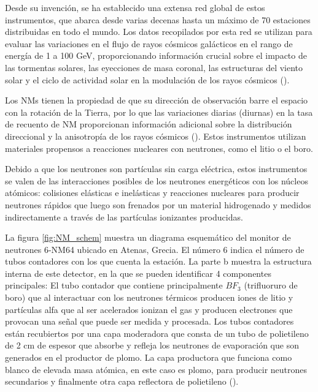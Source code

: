 Desde su invención, se ha establecido una extensa red global de estos instrumentos, que abarca desde varias decenas hasta un máximo de 70 estaciones distribuidas en todo el mundo. Los datos recopilados por esta red se utilizan para evaluar las variaciones en el flujo de rayos cósmicos galácticos en el rango de energía de 1 a 100 GeV, proporcionando información crucial sobre el impacto de las tormentas solares, las eyecciones de masa coronal, las estructuras del viento solar y el ciclo de actividad solar en la modulación de los rayos cósmicos (\cite{Ruffolo_2016}).

Los NMs tienen la propiedad de que su dirección de observación barre el espacio con la rotación de la Tierra, por lo que las variaciones diarias (diurnas) en la tasa de recuento de NM proporcionan información adicional sobre la distribución direccional y la anisotropía de los rayos cósmicos (\cite{Ruffolo_2016}). Estos instrumentos utilizan materiales propensos a reacciones nucleares con neutrones, como el litio o el boro.

Debido a que los neutrones son partículas sin carga eléctrica, estos instrumentos se valen de las interacciones posibles de los neutrones energéticos con los núcleos atómicos: colisiones elásticas e inelásticas y reacciones nucleares para producir neutrones rápidos que luego son frenados por un material hidrogenado y medidos indirectamente a través de las partículas ionizantes producidas.

La figura \ref{fig:NM_schem} muestra un diagrama esquemático del monitor de neutrones 6-NM64 ubicado en Atenas, Grecia. El número 6 indica el número de tubos contadores con los que cuenta la estación. La parte b muestra la estructura interna de este detector, en la que se pueden identificar 4 componentes principales: El tubo contador que contiene principalmente $BF_{3}$ (trifluoruro de boro) que al interactuar con los neutrones térmicos producen iones de litio y partículas alfa que al ser acelerados ionizan el gas y producen electrones que provocan una señal que puede ser medida y procesada. Los tubos contadores están recubiertos por una capa moderadora que consta de un tubo de polietileno de 2 cm de espesor que absorbe y refleja los neutrones de evaporación que son generados en el productor de plomo. La capa productora que funciona como blanco de elevada masa atómica, en este caso es plomo, para producir neutrones secundarios y finalmente otra capa reflectora de polietileno (\cite{OlgaMalandraki_2018}).


